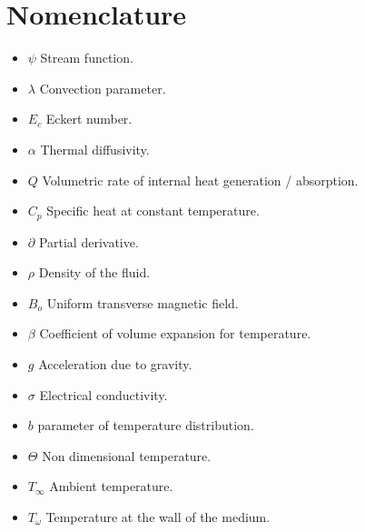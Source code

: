 \documentclass[a4paper,12pt]{report}
\begin{document}
{\section{Nomenclature}
\begin{itemize}
\item \textbf{$\psi$}   \hspace{0.5cm} Stream function.
\item \textbf{$\lambda$}   \hspace{0.5cm} Convection parameter.
\item \textbf{$E_c$}   \hspace{0.5cm} Eckert number.
\item \textbf{$\alpha$}   \hspace{0.5cm} Thermal diffusivity.
\item \textbf{$Q$}   \hspace{0.5cm} Volumetric rate of internal heat generation / absorption.
\item \textbf{$C_p$}   \hspace{0.5cm} Specific heat at constant temperature.
\item \textbf{$\partial$}   \hspace{0.5cm} Partial derivative.
\item \textbf{$\rho$}   \hspace{0.5cm} Density of the fluid.
\item \textbf{$B_o$}   \hspace{0.5cm} Uniform transverse magnetic field.
\item \textbf{$\beta$}   \hspace{0.5cm} Coefficient of volume expansion for temperature.
\item \textbf{$g$}   \hspace{0.5cm} Acceleration due to gravity.
\item \textbf{$\sigma$}   \hspace{0.5cm} Electrical conductivity.
\item \textbf{$b$}   \hspace{0.5cm} parameter of temperature distribution.
\item \textbf{$\Theta$}   \hspace{0.5cm} Non dimensional temperature.
\item \textbf{$T_\infty$}   \hspace{0.5cm} Ambient temperature.
\item \textbf{$T_\omega$}   \hspace{0.5cm} Temperature at the wall of the medium.

\end{itemize}}
\end{document}
